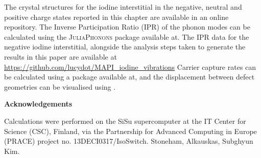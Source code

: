 The crystal structures for the iodine interstitial in the negative, neutral and positive charge states reported in this chapter are available 
in an online repository.\autocite{}
The Inverse Participation Ratio (IPR) of the phonon modes can be calculated using the \textsc{JuliaPhonons} package available at.
The IPR data for the negative iodine interstitial, alongside the analysis steps taken to generate the results in this paper are available at \url{https://github.com/lucydot/MAPI_iodine_vibrations}
Carrier capture rates can be calculated using a package available at,%
and the displacement between defect geometries can be visualised using .%

\textbf{Acknowledgements}

Calculations were performed on the SiSu supercomputer at the IT Center for Science (CSC), Finland, via the Partnership for Advanced Computing in Europe (PRACE) project no. 13DECI0317/IsoSwitch.
Stoneham, Alkauskas, Subghyun Kim.
